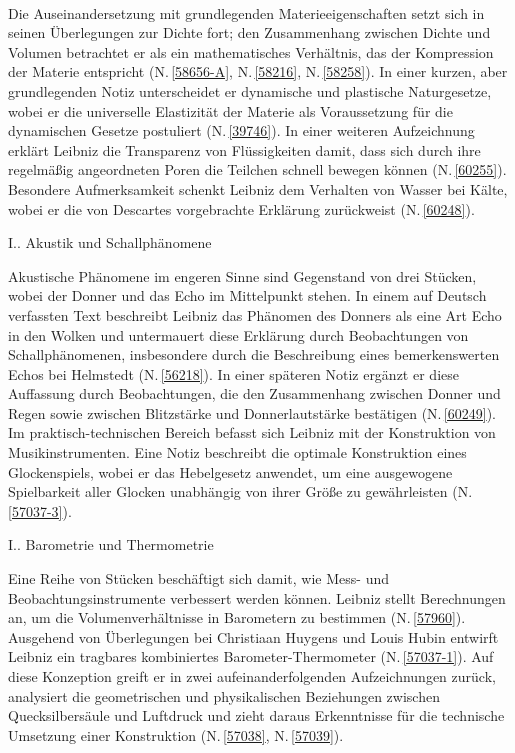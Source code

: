 \\ \indent
Die Auseinandersetzung mit grundlegenden Materieeigenschaften setzt sich in seinen Überlegungen zur Dichte fort; den Zusammenhang zwischen Dichte und Volumen betrachtet er als ein mathematisches Verhältnis, das der Kompression der Materie entspricht (N.\,\ref{58656-A}, N.\,\ref{58216}, N.\,\ref{58258}). In einer kurzen, aber grundlegenden Notiz unterscheidet er dynamische und plastische Naturgesetze, wobei er die universelle Elastizität der Materie als Voraussetzung für die dynamischen Gesetze postuliert (N.\,\ref{39746}). In einer weiteren Aufzeichnung erklärt Leibniz die Transparenz von Flüssigkeiten damit, dass sich durch ihre regelmäßig angeordneten Poren die Teilchen schnell bewegen können (N.\,\ref{60255}). Besondere Aufmerksamkeit schenkt Leibniz dem Verhalten von Wasser bei Kälte, wobei er die von Descartes vorgebrachte Erklärung zurückweist (N.\,\ref{60248}).
\par 
\vspace{1em}
\noindent
I.. Akustik und Schallphänomene%
\par
\noindent
Akustische Phänomene im engeren Sinne sind Gegenstand von drei Stücken, wobei der Donner und das Echo im Mittelpunkt stehen. In einem auf Deutsch verfassten Text beschreibt Leibniz das Phänomen des Donners als eine Art Echo in den Wolken und untermauert diese Erklärung durch Beobachtungen von Schallphänomenen, insbesondere durch die Beschreibung eines bemerkenswerten Echos bei Helmstedt (N.\,\ref{56218}). In einer späteren Notiz ergänzt er diese Auffassung durch Beobachtungen, die den Zusammenhang zwischen Donner und Regen sowie zwischen Blitzstärke und Donnerlautstärke bestätigen (N.\,\ref{60249}). %
Im praktisch-technischen Bereich befasst sich Leibniz mit der Konstruktion von Musikinstrumenten. Eine Notiz beschreibt die optimale Konstruktion eines Glockenspiels, wobei er das Hebelgesetz anwendet, um eine ausgewogene Spielbarkeit aller Glocken unabhängig von ihrer Größe zu gewährleisten (N.\,\ref{57037-3}).%
\par
\vspace{1em}
\noindent
I.. Barometrie und Thermometrie
\par
\noindent
Eine Reihe von Stücken beschäftigt sich damit, wie Mess- und Beobachtungsinstrumente verbessert werden können. Leibniz stellt Berechnungen an, um die Volumenverhältnisse in Barometern zu bestimmen (N.\,\ref{57960}). Ausgehend von Überlegungen bei  Christiaan Huygens und Louis Hubin entwirft Leibniz ein tragbares kombiniertes Barometer-Thermometer (N.\,\ref{57037-1}). Auf diese Konzeption greift er in zwei aufeinanderfolgenden Aufzeichnungen zurück, analysiert die geometrischen und physikalischen Beziehungen zwischen Quecksilbersäule und Luftdruck und zieht daraus Erkenntnisse für die technische Umsetzung einer Konstruktion (N.\,\ref{57038}, N.\,\ref{57039}). %
